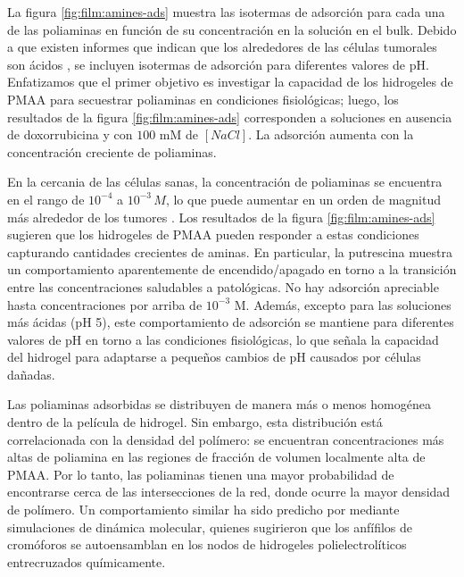 La figura  \ref{fig:film:amines-ads} muestra las isotermas de adsorci\'on para cada una de las poliaminas en funci\'on de su concentraci\'on en la soluci\'on en el bulk. Debido a que existen informes que indican que los alrededores de las c\'elulas tumorales son \'acidos \cite{vaupel1989blood,Tannock1989,Raghunand1999, rofstad2006acidic, schmaljohann2006thermo, Koltai2016}, se incluyen isotermas de adsorci\'on para diferentes valores de pH. Enfatizamos que el primer objetivo es investigar la capacidad de los hidrogeles de PMAA para secuestrar poliaminas en condiciones fisiol\'ogicas; luego, los resultados de la figura \ref{fig:film:amines-ads} corresponden a soluciones en ausencia de doxorrubicina y con $100$ mM de $[NaCl]$. La adsorci\'on aumenta con la concentraci\'on creciente de poliaminas. %

En la cercania de las c\'elulas sanas, la concentraci\'on de poliaminas se encuentra en el rango de $10^{-4}$ a $10^{-3}\, M$, lo que puede aumentar en un orden de magnitud m\'as alrededor de los tumores \cite{Soda2011}. Los resultados de la figura \ref{fig:film:amines-ads} sugieren que los hidrogeles de PMAA pueden responder a estas condiciones capturando cantidades crecientes de aminas. En particular, la putrescina muestra un comportamiento aparentemente de encendido/apagado en torno a la transici\'on entre las concentraciones saludables a patol\'ogicas. No hay adsorci\'on apreciable hasta concentraciones por arriba de $10^{-3}$ M. Adem\'as, excepto para las soluciones m\'as \'acidas (pH 5), este comportamiento de adsorci\'on se mantiene para diferentes valores de pH en torno a las condiciones fisiol\'ogicas, lo que se\~nala  la capacidad del hidrogel para adaptarse a peque\~nos cambios de pH causados por c\'elulas da\~nadas.

Las poliaminas adsorbidas se distribuyen de manera m\'as o menos homog\'enea dentro de la pel\'icula de hidrogel. Sin embargo, esta distribuci\'on est\'a correlacionada con la densidad del pol\'imero: se encuentran concentraciones m\'as altas de poliamina en las regiones de fracci\'on de volumen localmente alta de PMAA. Por lo tanto, las poliaminas tienen una mayor probabilidad de encontrarse cerca de las intersecciones de la red, donde ocurre la mayor densidad de pol\'imero. Un comportamiento similar ha sido predicho por  \citet{Sai2020} mediante simulaciones de din\'amica molecular, quienes sugirieron que los anf\'ifilos de crom\'oforos se autoensamblan en los nodos de hidrogeles polielectrol\'iticos entrecruzados qu\'imicamente.


